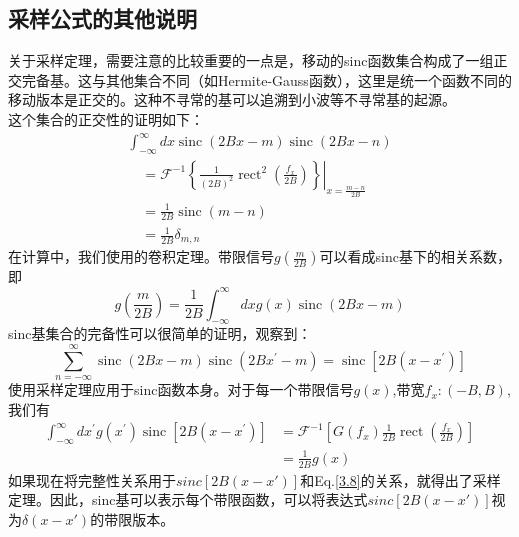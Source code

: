 \documentclass[10pt, UTF8]{ctexart}%
\newcommand{\InsertEqution}[2]{\begin{equation}
  \label{#1}
   #2
 \end{equation}}
\newcommand{\RefEq}[1]{Eq.\ref{#1}}
\newcommand{\InsertInlineEq}[1]{$#1$}
\begin{document}
\begin{sloppypar}
\subsection{采样公式的其他说明}
关于采样定理，需要注意的比较重要的一点是，移动的sinc函数集合构成了一组正交完备基。这与其他集合不同（如Hermite-Gauss函数），这里是统一个函数不同的移动版本是正交的。这种不寻常的基可以追溯到小波等不寻常基的起源。\\
这个集合的正交性的证明如下：\InsertEqution{3.7}{\begin{array}{l}
  \int_{-\infty}^{\infty} d x \operatorname{sinc}(2 B x-m) \operatorname{sinc}(2 B x-n) \\
  \quad=\left.\mathcal{F}^{-1}\left\{\frac{1}{(2 B)^{2}} \operatorname{rect}^{2}\left(\frac{f_{x}}{2 B}\right)\right\}\right|_{x=\frac{m-n}{2 B}} \\
  \quad=\frac{1}{2 B} \operatorname{sinc}(m-n) \\
  \quad=\frac{1}{2 B} \delta_{m, n}
  \end{array}}
  在计算中，我们使用的卷积定理。带限信号\InsertInlineEq{g(\frac{m}{2B})}可以看成sinc基下的相关系数，即\InsertEqution{3.8}{g\left(\frac{m}{2 B}\right)=\frac{1}{2 B} \int_{-\infty}^{\infty} d x g(x) \operatorname{sinc}(2 B x-m)}
sinc基集合的完备性可以很简单的证明，观察到：\InsertEqution{3.9}{\sum_{n=-\infty}^{\infty} \operatorname{sinc}(2 B x-m) \operatorname{sinc}\left(2 B x^{\prime}-m\right)=\operatorname{sinc}\left[2 B\left(x-x^{\prime}\right)\right]}
使用采样定理应用于sinc函数本身。对于每一个带限信号\InsertInlineEq{g(x)},带宽\InsertInlineEq{f_{x}:(-B, B)},我们有\InsertEqution{3.10}{\begin{aligned}
  \int_{-\infty}^{\infty} d x^{\prime} g\left(x^{\prime}\right) \operatorname{sinc}\left[2 B\left(x-x^{\prime}\right)\right] &=\mathcal{F}^{-1}\left[G\left(f_{x}\right) \frac{1}{2 B} \operatorname{rect}\left(\frac{f_{x}}{2 B}\right)\right] \\
  &=\frac{1}{2 B} g(x)
  \end{aligned}}
  如果现在将完整性关系用于\InsertInlineEq{sinc[2B(x-x')]}和\RefEq{3.8}的关系，就得出了采样定理。因此，sinc基可以表示每个带限函数，可以将表达式\InsertInlineEq{sinc[2B(x-x')]}视为\InsertInlineEq{\delta(x-x')}的带限版本。

\end{sloppypar}
\end{document}

